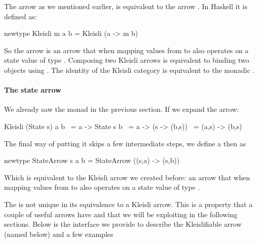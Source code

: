 The  arrow \cite{dawsonCompoundMonadsKleisli2007} as we
mentioned earlier, is equivalent to the arrow . In Haskell it is defined as:

\begin{haskellcode}
newtype Kleisli m a b = Kleisli (a -> m b)
\end{haskellcode}

So the arrow  is an arrow that when
mapping values from  to  also operates on a state
value of type . Composing two Kleisli arrows is equivalent to
binding two  objects using \hask{>=>}. The identity of
the Kleisli category is equivalent to the monadic .

\paragraph{The state arrow}

We already saw the  monad in the previous section. If we expand
the  arrow:

\begin{haskellcode}
Kleisli (State s) a b
  ~= a -> State s b
  ~= a -> (s -> (b,s))
  ~= (a,s) -> (b,s)
\end{haskellcode}

The final way of putting it skips a few intermediate steps, we define
a  then as

\begin{haskellcode}
newtype StateArrow s a b = StateArrow ((s,a) -> (s,b))
\end{haskellcode}

Which is equivalent to the Kleisli arrow we created before: an arrow
that when mapping values from  to  also operates on a state
value of type .

The  is not unique in its equivalence to a Kleisli
arrow. This is a property that a couple of useful arrows have and that
we will be exploiting in the following sections. Below is the
interface we provide to describe the Kleislifiable arrow (named
 below) and a few examples

